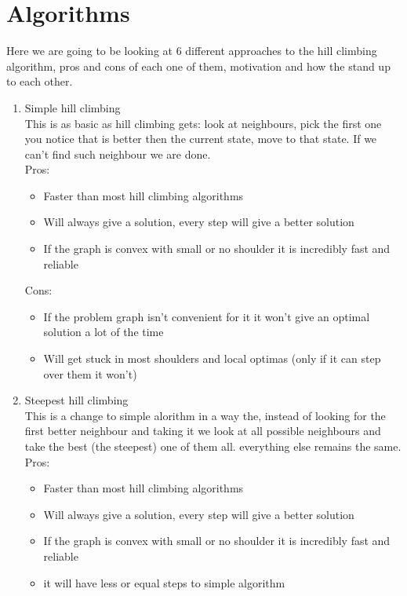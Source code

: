 \documentclass[10pt,a4paper]{article}
\begin{document}
	\section{Algorithms}
		Here we are going to be looking at 6 different approaches to the hill climbing algorithm, pros and cons of each one of them, motivation and how the stand up to each other.
		\begin{enumerate}
			\item Simple hill climbing \\
				This is as basic as hill climbing gets: look at neighbours, pick the first one you notice that is better then the current state, move to that state. If we can't find such neighbour we are done.\\
				Pros:
				\begin{itemize}
					\item Faster than most hill climbing algorithms
					\item Will always give a solution, every step will give a better solution
					\item If the graph is convex with small or no shoulder it is incredibly fast and reliable
				\end{itemize}
				Cons:
				\begin{itemize}
                                        \item If the problem graph isn't convenient for it it won't give an optimal solution a lot of the time
					\item Will get stuck in most shoulders and local optimas (only if it can step over them it won't)
                                \end{itemize}
			\item Steepest hill climbing \\
				This is a change to simple alorithm in a way the, instead of looking for the first better neighbour and taking it we look at all possible neighbours and take the best (the steepest) one of them all. everything else remains the same. \\
				Pros:
				\begin{itemize}
					\item Faster than most hill climbing algorithms
					\item Will always give a solution, every step will give a better solution
					\item If the graph is convex with small or no shoulder it is incredibly fast and reliable
					\item it will have less or equal steps to simple algorithm

\end{itemize}
\end{enumerate}
\end{document}
